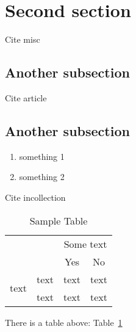 \section{Second section}
Cite misc~\cite{misc1}

\subsection{Another subsection}
Cite article~\cite{article1}
\subsection{Another subsection}

\begin{enumerate}
  \item something 1
  \item something 2
\end{enumerate}

Cite incollection~\cite{incollection1}

\begin{table}
  \centering
  \label{tab:1}
  \caption{Sample Table}
  \begin{tabular}{|c|c|c|c|}
    \hline
    \multicolumn{2}{|c|}{}&\multicolumn{2}{c|}{Some text}\\
    \cline{3-4}
    \multicolumn{2}{|c|}{}&Yes&No\\
    \hline
    \multirow{2}{*}{text}&text&text&text\\
    \cline{2-4}
    &text&text&text\\
    \hline
  \end{tabular}
\end{table}

There is a table above: Table~\ref{tab:1}